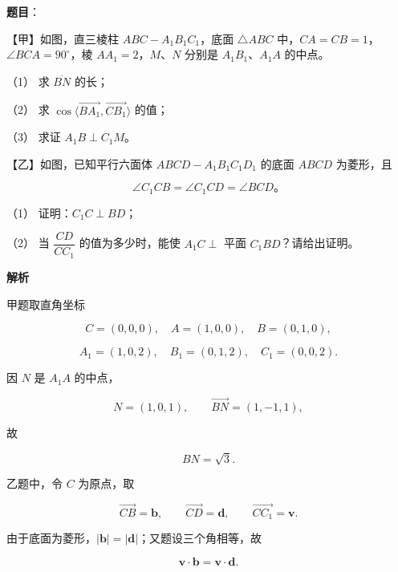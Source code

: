 \begin{answer}

\textbf{题目}：

【甲】如图，直三棱柱 $ABC-A_1B_1C_1$，底面 $\triangle ABC$ 中，$CA=CB=1$，$\angle BCA=90^\circ$，棱 $AA_1=2$，$M$、$N$ 分别是 $A_1B_1$、$A_1A$ 的中点。
\nopagebreak[4]
\begin{center}\end{center}
\nopagebreak[4]
（1） 求 $\overline{BN}$ 的长；

（2） 求 $\cos\langle\overrightarrow{BA_1},\overrightarrow{CB_1}\rangle$ 的值；

（3） 求证 $A_1B\perp C_1M$。

【乙】如图，已知平行六面体 $ABCD-A_1B_1C_1D_1$ 的底面 $ABCD$ 为菱形，且

\nopagebreak[4]
\[
\angle C_1CB=\angle C_1CD=\angle BCD\text{。}
\]
\nopagebreak[4]
\begin{center}\end{center}
\nopagebreak[4]
（1） 证明：$C_1C\perp BD$；

（2） 当 $\dfrac{CD}{CC_1}$ 的值为多少时，能使 $A_1C\perp$ 平面 $C_1BD$？请给出证明。

\textbf{解析}


甲题取直角坐标

\nopagebreak[4]
\[
C=(0,0,0),\quad A=(1,0,0),\quad B=(0,1,0),
\]

\nopagebreak[4]
\[
A_1=(1,0,2),\quad B_1=(0,1,2),\quad C_1=(0,0,2).
\]

因 $N$ 是 $A_1A$ 的中点，

\nopagebreak[4]
\[
N=(1,0,1),
\qquad
\overrightarrow{BN}=(1,-1,1),
\]

故

\nopagebreak[4]
\[
BN=\sqrt3.
\]

乙题中，令 $C$ 为原点，取

\nopagebreak[4]
\[
\overrightarrow{CB}=\mathbf b,\qquad
\overrightarrow{CD}=\mathbf d,\qquad
\overrightarrow{CC_1}=\mathbf v.
\]

由于底面为菱形，$|\mathbf b|=|\mathbf d|$；又题设三个角相等，故

\nopagebreak[4]
\[
\mathbf v\cdot\mathbf b=\mathbf v\cdot\mathbf d.
\]


\end{answer}

